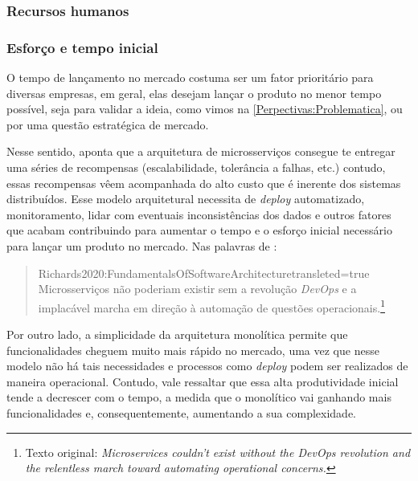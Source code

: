 \subsubsection{Recursos humanos}

\subsubsection{Esforço e tempo inicial}

O tempo de lançamento no mercado costuma ser um fator prioritário para diversas empresas, em geral,
elas desejam lançar o produto no menor tempo possível, seja para validar a ideia, como
vimos na \autoref{Perpectivas:Problematica}, ou por uma questão estratégica de mercado.

Nesse sentido,  aponta que a arquitetura de
microsserviços consegue te entregar uma séries de recompensas (escalabilidade, tolerância a falhas,
etc.) contudo, essas recompensas vêem acompanhada do alto custo que é inerente dos sistemas distribuídos.
Esse modelo arquitetural necessita de \textit{deploy} automatizado, monitoramento, lidar com
eventuais inconsistências dos dados e outros fatores que acabam contribuindo para aumentar o tempo e o esforço
inicial necessário para lançar um produto no mercado. Nas palavras de
:

\begin{quotation}{Richards2020:FundamentalsOfSoftwareArchitecture}{transleted=true}
    Microsserviços não poderiam existir sem a revolução \textit{DevOps} e a implacável marcha em direção à
    automação de questões operacionais.\footnote{Texto original: \textit{Microservices couldn't exist
    without the DevOps revolution and the relentless march toward automating operational concerns.}}
\end{quotation}

Por outro lado, a simplicidade da arquitetura monolítica permite que funcionalidades cheguem muito
mais rápido no mercado, uma vez que nesse modelo não há tais necessidades e processos como
\textit{deploy} podem ser realizados de maneira operacional. Contudo, vale ressaltar que essa alta
produtividade inicial tende a decrescer com o tempo, a medida que o monolítico vai ganhando mais
funcionalidades e, consequentemente, aumentando a sua complexidade.

